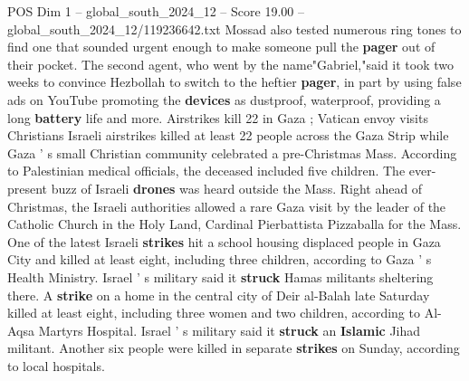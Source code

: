 \begin{textsample}{POS Dim 1 – global\_south\_2024\_12 – Score 19.00 – global\_south\_2024\_12/119236642.txt}
Mossad also tested numerous ring tones to find one that sounded urgent enough to make someone pull the \textbf{pager} out of their pocket.
The second agent, who went by the name"Gabriel,"said it took two weeks to convince Hezbollah to switch to the heftier \textbf{pager}, in part by using false ads on YouTube promoting the \textbf{devices} as dustproof, waterproof, providing a long \textbf{battery} life and more.
Airstrikes kill 22 in Gaza ; Vatican envoy visits Christians Israeli airstrikes killed at least 22 people across the Gaza Strip while Gaza ' s small Christian community celebrated a pre-Christmas Mass.
According to Palestinian medical officials, the deceased included five children.
The ever-present buzz of Israeli \textbf{drones} was heard outside the Mass.
Right ahead of Christmas, the Israeli authorities allowed a rare Gaza visit by the leader of the Catholic Church in the Holy Land, Cardinal Pierbattista Pizzaballa for the Mass.
One of the latest Israeli \textbf{strikes} hit a school housing displaced people in Gaza City and killed at least eight, including three children, according to Gaza ' s Health Ministry.
Israel ' s military said it \textbf{struck} Hamas militants sheltering there.
A \textbf{strike} on a home in the central city of Deir al-Balah late Saturday killed at least eight, including three women and two children, according to Al-Aqsa Martyrs Hospital.
Israel ' s military said it \textbf{struck} an \textbf{Islamic} Jihad militant.
Another six people were killed in separate \textbf{strikes} on Sunday, according to local hospitals.

\end{textsample}
